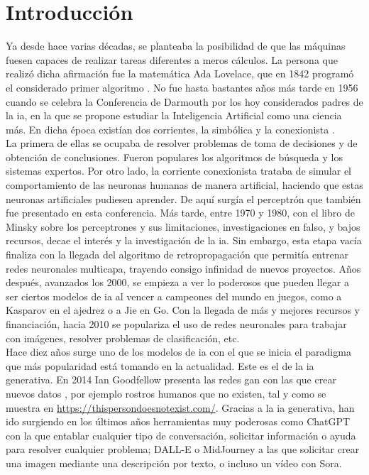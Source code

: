 \chapter*{Introducción}

	Ya desde hace varias décadas, se planteaba la posibilidad de que las máquinas fuesen capaces de realizar tareas diferentes a meros cálculos. La persona que realizó dicha afirmación fue la matemática Ada Lovelace, que en 1842 programó el considerado primer algoritmo \cite{notes_ada}. No fue hasta bastantes años más tarde en 1956 cuando se celebra la Conferencia de Darmouth por los hoy considerados padres de la \gls{ia}, en la que se propone estudiar la Inteligencia Artificial como una ciencia más. En dicha época existían dos corrientes, la simbólica y la conexionista \cite{darmouth,info_darmouth}. \\
	
	La primera de ellas se ocupaba de resolver problemas de toma de decisiones y de obtención de conclusiones. Fueron populares los algoritmos de búsqueda y los sistemas expertos. Por otro lado, la corriente conexionista trataba de simular el comportamiento de las neuronas humanas de manera artificial, haciendo que estas neuronas artificiales pudiesen aprender. De aquí surgía el perceptrón que también fue presentado en esta conferencia. Más tarde, entre 1970 y 1980, con el libro de Minsky \cite{perceptrons} sobre los perceptrones y sus limitaciones, investigaciones en falso, y bajos recursos, decae el interés y la investigación de la \gls{ia}. Sin embargo, esta etapa vacía finaliza con la llegada del algoritmo de retropropagación que permitía entrenar redes neuronales multicapa, trayendo consigo infinidad de nuevos proyectos. Años después, avanzados los 2000, se empieza a ver lo poderosos que pueden llegar a ser ciertos modelos de \gls{ia} al vencer a campeones del mundo en juegos, como a Kasparov en el ajedrez o a Jie en Go. Con la llegada de más y mejores recursos y financiación, hacia 2010 se populariza el uso de redes neuronales para trabajar con imágenes, resolver problemas de clasificación, etc. \cite{historiaIA} \\
	
	Hace diez años surge uno de los modelos de \gls{ia} con el que se inicia el paradigma que más popularidad está tomando en la actualidad. Este es el de la \gls{ia} generativa. En 2014 Ian Goodfellow presenta las redes \gls{gan} con las que crear nuevos datos \cite{historiaIA}, por ejemplo rostros humanos que no existen, tal y como se muestra en \url{https://thispersondoesnotexist.com/}. Gracias a la \gls{ia} generativa, han ido surgiendo en los últimos años herramientas muy poderosas como ChatGPT con la que entablar cualquier tipo de conversación, solicitar información o ayuda para resolver cualquier problema; DALL-E o MidJourney a las que solicitar crear una imagen mediante una descripción por texto, o incluso un vídeo con Sora. \\
	
